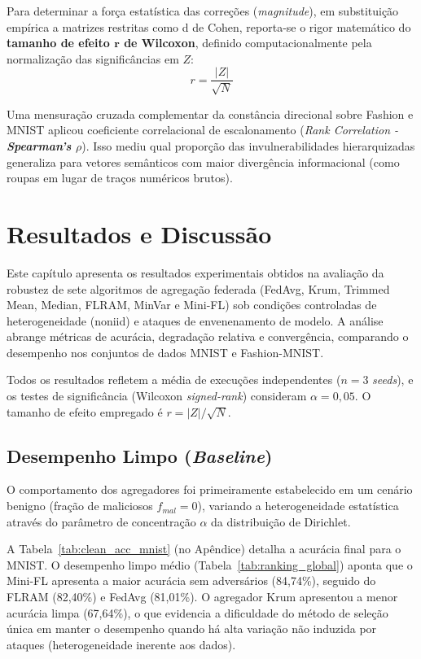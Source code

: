 Para determinar a força estatística das correções (\textit{magnitude}), em substituição empírica a matrizes restritas como d de Cohen, reporta-se o rigor matemático do \textbf{tamanho de efeito $\mathbf{r}$ de Wilcoxon}, definido computacionalmente pela normalização das significâncias em $Z$:
\begin{equation}
    r = \frac{|Z|}{\sqrt{N}}
\end{equation}

Uma mensuração cruzada complementar da constância direcional sobre Fashion e MNIST aplicou coeficiente correlacional de escalonamento (\textit{Rank Correlation - \textbf{Spearman's $\rho$}}). Isso mediu qual proporção das invulnerabilidades hierarquizadas generaliza para vetores semânticos com maior divergência informacional (como roupas em lugar de traços numéricos brutos).


\newpage

\chapter{Resultados e Discussão}
\label{chap:resultados}

Este capítulo apresenta os resultados experimentais obtidos na avaliação da robustez de sete algoritmos de agregação federada (FedAvg, Krum, Trimmed Mean, Median, FLRAM, MinVar e Mini-FL) sob condições controladas de heterogeneidade (\gls{noniid}) e ataques de envenenamento de modelo. A análise abrange métricas de acurácia, degradação relativa e convergência, comparando o desempenho nos conjuntos de dados MNIST e Fashion-MNIST.

Todos os resultados refletem a média de execuções independentes ($n=3$ \textit{seeds}), e os testes de significância (Wilcoxon \textit{signed-rank}) consideram $\alpha = 0,05$. O tamanho de efeito empregado é $r = |Z|/\sqrt{N}$.

\section{Desempenho Limpo (\textit{Baseline})}
\label{sec:res-baseline}

O comportamento dos agregadores foi primeiramente estabelecido em um cenário benigno (fração de maliciosos $f_{mal}=0$), variando a heterogeneidade estatística através do parâmetro de concentração $\alpha$ da distribuição de Dirichlet.

A Tabela~\ref{tab:clean_acc_mnist} (no Apêndice) detalha a acurácia final para o MNIST. O desempenho limpo médio (Tabela~\ref{tab:ranking_global}) aponta que o Mini-FL apresenta a maior acurácia sem adversários (84,74\%), seguido do FLRAM (82,40\%) e FedAvg (81,01\%). O agregador Krum apresentou a menor acurácia limpa (67,64\%), o que evidencia a dificuldade do método de seleção única em manter o desempenho quando há alta variação não induzida por ataques (heterogeneidade inerente aos dados).

